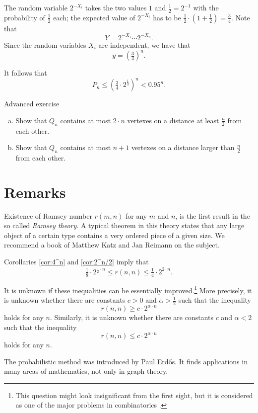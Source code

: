 The random variable $2^{-X_i}$ takes the two values $1$ and $\tfrac12=2^{-1}$ with the probability of $\tfrac12$ each;
the expected value of $2^{-X_i}$ has to be $\tfrac12\cdot (1+\tfrac12)=\tfrac 34$.
Note that 
\[Y=2^{-X_1}\cdots 2^{-X_n}.\]
Since the random variables $X_i$ are independent, we have that
\[y=\left(\tfrac34\right)^n.\]

It follows that 
\[P_n\le \left(\tfrac34\cdot 2^{\frac13}\right)^n< 0.95^n.\]
\qedsf

\pagebreak[1]
\begin{thm}{Advanced exercise}\label{ex:lin-Qn}
\begin{enumerate}[(a)]
\item Show that $Q_n$ contains at most $2\cdot n$ vertexes on a distance at least $\tfrac n2$ from each other. 
\item Show that $Q_n$ contains at most $n+1$ vertexes on a distance larger than $\tfrac n2$ from each other. 
\end{enumerate}
\end{thm}
 

\section*{Remarks}

Existence of Ramsey number $r(m,n)$ for any $m$ and $n$, is the first result in the so called \emph{Ramsey theory}. 
A typical theorem in this theory states that any large object of a certain type contains a very ordered piece of a given size.
We recommend a book of Matthew Katz and Jan Reimann \cite{katz-reimann} on the subject. 

Corollaries \ref{cor:4^n} and \ref{cor:2^n/2} imply that 
\[\tfrac18\cdot 2^{\frac12\cdot n}\le r(n,n)\le \tfrac14\cdot 2^{2\cdot n}.\]

It is unknown if these inequalities can be essentially improved.\footnote{This question might look insignificant from the first sight, but it is considered as one of the major problems in combinatorics \cite{gowers}.}
More precisely, it is unknown whether there are constants $c>0$ and $\alpha>\tfrac12$ such that the inequality
\[r(n,n)\ge c\cdot 2^{\alpha\cdot n}\]
holds for any $n$.
Similarly, it is unknown whether there are constants $c$ and $\alpha<2$ such that the inequality
\[r(n,n)\le c\cdot 2^{\alpha\cdot n}\]
holds for any $n$.

The probabilistic method was introduced by Paul Erd\H os.
It finds applications in many areas of mathematics, not only in graph theory.

